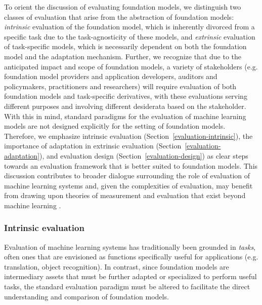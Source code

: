 To orient the discussion of evaluating foundation models, we distinguish two classes of evaluation that arise from the abstraction of foundation models: \textit{intrinsic} evaluation of the foundation model, which is inherently divorced from a specific task due to the task-agnosticity of these models, and \textit{extrinsic} evaluation of task-specific models, which is necessarily dependent on both the foundation model and the adaptation mechanism. Further, we recognize that due to the anticipated impact and scope of foundation models, a variety of stakeholders (e.g. foundation model providers and application developers, auditors and policymakers, practitioners and researchers) will require evaluation of both foundation models and task-specific derivatives, with these evaluations serving different purposes and involving different desiderata based on the stakeholder. With this in mind, standard paradigms for the evaluation of machine learning models are not designed explicitly for the setting of foundation models. Therefore, we emphasize intrinsic evaluation (Section~\ref{evaluation-intrinsic}), the importance of adaptation in extrinsic evaluation (Section~\ref{evaluation-adaptation}), and evaluation design (Section~\ref{evaluation-design}) as clear steps towards an evaluation framework that is better suited to foundation models. This discussion contributes to broader dialogue surrounding the role of evaluation of machine learning systems \citep[][\textit{inter alia}]{galliers1993, lipton2019, ribeiro2020beyond, linzen2020, kiela2021dynabench, milli2021, jacobs2021, bowman2021, dehgani2021, ma2021} and, given the complexities of evaluation, may benefit from drawing upon theories of measurement and evaluation that exist beyond machine learning \citep{messick1987, jackman2008, loevinger1957, messick1988, hand2010, brewer2014}.   

\subsubsection{Intrinsic evaluation}
\label{sec:evaluation-intrinsic}

Evaluation of machine learning systems has traditionally been grounded in \textit{tasks}, often ones that are envisioned as functions specifically useful for applications (e.g. translation, object recognition). In contrast, since foundation models are intermediary assets that must be further adapted or specialized to perform useful tasks, the standard evaluation paradigm must be altered to facilitate the direct understanding and comparison of foundation models.

